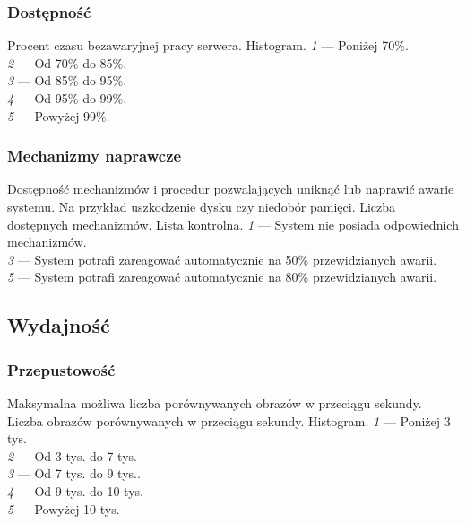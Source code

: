 \documentclass[10pt]{dokument-ppi}
\begin{document}
\subsubsection{Dostępność}
\begin{requirement}
    \metric*%
        Procent czasu bezawaryjnej pracy serwera.
    \tool%
        Histogram.
    \scale%
        \emph{1} --- Poniżej 70\%.\\
        \emph{2} --- Od 70\% do 85\%.\\
        \emph{3} --- Od 85\% do 95\%.\\
        \emph{4} --- Od 95\% do 99\%.\\
        \emph{5} --- Powyżej 99\%.
\end{requirement}

\subsubsection{Mechanizmy naprawcze}
\begin{requirement}
    \desc%
        Dostępność mechanizmów i procedur pozwalających uniknąć lub naprawić
        awarie systemu. Na przykład uszkodzenie dysku czy niedobór pamięci.
    \metric%
        Liczba dostępnych mechanizmów.
    \tool%
        Lista kontrolna.
    \scale%
        \emph{1} --- System nie posiada odpowiednich mechanizmów.\\
        \emph{3} --- System potrafi zareagować automatycznie na 50\% przewidzianych awarii.\\
        \emph{5} --- System potrafi zareagować automatycznie na 80\% przewidzianych awarii.
\end{requirement}


\subsection{Wydajność}

\subsubsection{Przepustowość}
\begin{requirement}
    \desc%
        Maksymalna możliwa liczba porównywanych obrazów w przeciągu sekundy.
    \metric%
        Liczba obrazów porównywanych w przeciągu sekundy.
    \tool%
        Histogram.
    \scale%
        \emph{1} --- Poniżej 3 tys.\\
        \emph{2} --- Od 3 tys. do 7 tys.\\
        \emph{3} --- Od 7 tys. do 9 tys..\\
        \emph{4} --- Od 9 tys. do 10 tys.\\
        \emph{5} --- Powyżej 10 tys.
\end{requirement}
\end{document}

